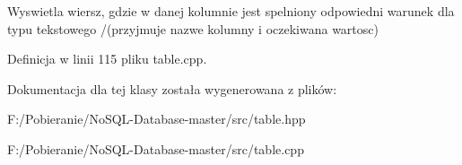 Wyswietla wiersz, gdzie w danej kolumnie jest spelniony odpowiedni warunek dla typu tekstowego /(przyjmuje nazwe kolumny i oczekiwana wartosc) 

Definicja w linii 115 pliku table.\+cpp.



Dokumentacja dla tej klasy została wygenerowana z plików\+:\begin{DoxyCompactItemize}
\item 
F\+:/\+Pobieranie/\+No\+S\+Q\+L-\/\+Database-\/master/src/table.\+hpp\item 
F\+:/\+Pobieranie/\+No\+S\+Q\+L-\/\+Database-\/master/src/table.\+cpp\end{DoxyCompactItemize}

